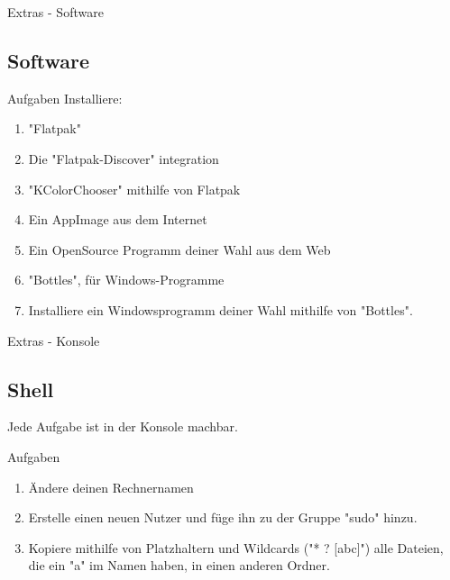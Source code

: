 \begin{frame}{Extras - Software}
    \subsection{Software}\label{subsec:software}

    \begin{alertblock}{Aufgaben}
        \pause
        Installiere:\pause
        \begin{enumerate}
            \item "Flatpak"\pause
            \item Die "Flatpak-Discover" integration\pause
            \item "KColorChooser" mithilfe von Flatpak\pause
            \item Ein AppImage aus dem Internet\pause
            \item Ein OpenSource Programm deiner Wahl aus dem Web\pause
            \item "Bottles", für Windows-Programme\pause
            \item Installiere ein Windowsprogramm deiner Wahl mithilfe von "Bottles".
        \end{enumerate}

    \end{alertblock}

\end{frame}


\begin{frame}{Extras - Konsole}
    \subsection{Shell}\label{subsec:shell}
    \pause
    Jede Aufgabe ist in der Konsole machbar.
    \pause
    \vspace{0.5cm}
    \begin{alertblock}{Aufgaben}
        \begin{enumerate}\pause
            \item Ändere deinen Rechnernamen\pause
            \item Erstelle einen neuen Nutzer und füge ihn zu der Gruppe "sudo" hinzu.\pause
            \item Kopiere mithilfe von Platzhaltern und Wildcards ("* ? [abc]") alle Dateien, die ein "a" im Namen haben, in einen anderen Ordner.
        \end{enumerate}
    \end{alertblock}

\end{frame}


